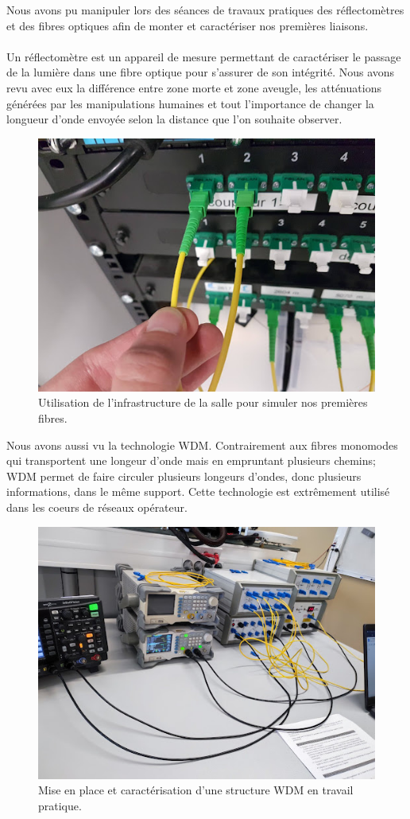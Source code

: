 Nous avons pu manipuler lors des séances de travaux pratiques des réflectomètres et des fibres optiques afin de monter et caractériser nos premières liaisons.
\\ \\
Un réflectomètre est un appareil de mesure permettant de caractériser le passage de la lumière dans une fibre optique pour s'assurer de son intégrité. Nous avons revu avec eux la différence entre zone morte et zone aveugle, les atténuations générées par les manipulations humaines et tout l'importance de changer la longueur d'onde envoyée selon la distance que l'on souhaite observer.

\begin{figure}[H]
      \centering
      \includegraphics[width=\textwidth - \textwidth / 5]{ressources/r306/01.jpg}
      \caption{Utilisation de l'infrastructure de la salle pour simuler nos premières fibres.}
      \label{fig:r306-01}
\end{figure}

Nous avons aussi vu la technologie WDM. Contrairement aux fibres monomodes qui transportent une longeur d'onde mais en empruntant plusieurs chemins; WDM permet de faire circuler plusieurs longeurs d'ondes, donc plusieurs informations, dans le même support. Cette technologie est extrêmement utilisé dans les coeurs de réseaux opérateur.

\begin{figure}[H]
      \centering
      \includegraphics[width=\textwidth - \textwidth / 5]{ressources/r306/00.jpg}
      \caption{Mise en place et caractérisation d'une structure WDM en travail pratique.}
      \label{fig:r306-02}
\end{figure}